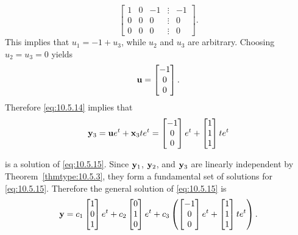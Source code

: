 \documentclass{ximera}
\begin{document}
\begin{example}
\begin{explanation}
$$\begin{bmatrix} 1 & 0 &- 1 &\vdots& -1\\ 0 & 0 & 0
&\vdots& 0\\ 0 & 0 & 0 &\vdots&0\end{bmatrix}.
$$
This implies that $u_1=-1+u_3$, while  $u_2$  and $u_3$ are arbitrary.
Choosing $u_2=u_3=0$  yields
$$
{\bf u}=\begin{bmatrix}-1\\0\\0\end{bmatrix}.
$$
 Therefore \eqref{eq:10.5.14} implies that
$$
{\bf y}_3={\bf u}e^t+{\bf
x}_3te^t=\begin{bmatrix}-1\\0\\0\end{bmatrix}e^t+\begin{bmatrix}1\\1\\1\end{bmatrix}te^t
$$

is a solution of  \eqref{eq:10.5.15}. Since ${\bf y}_1$, ${\bf y}_2$, and
${\bf y}_3$ are linearly independent by Theorem~\ref{thmtype:10.5.3},
they form a fundamental set of solutions for \eqref{eq:10.5.15}.
Therefore the general solution of \eqref{eq:10.5.15} is
$$
{\bf y}=c_1\begin{bmatrix}1\\0\\1\end{bmatrix}e^t+c_2\begin{bmatrix}0\\1\\0\end{bmatrix}e^t
+c_3\left(\begin{bmatrix}-1\\0\\0\end{bmatrix}e^t+\begin{bmatrix}1\\1\\1\end{bmatrix}te^t\right).
$$
\end{explanation}
\end{example}
\end{document}
